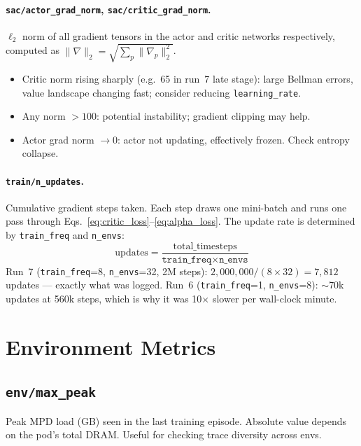 \documentclass[11pt]{article}
\begin{document}
\paragraph{\texttt{sac/actor\_grad\_norm}, \texttt{sac/critic\_grad\_norm}.}
$\ell_2$ norm of all gradient tensors in the actor and critic networks
respectively, computed as $\|\nabla\|_2 = \sqrt{\sum_p \|\nabla_p\|_2^2}$.
\begin{itemize}
  \item Critic norm rising sharply (e.g.\ 65 in run~7 late stage): large Bellman
        errors, value landscape changing fast; consider reducing \texttt{learning\_rate}.
  \item Any norm $> 100$: potential instability; gradient clipping may help.
  \item Actor grad norm $\to 0$: actor not updating, effectively frozen.
        Check entropy collapse.
\end{itemize}

\paragraph{\texttt{train/n\_updates}.}
Cumulative gradient steps taken.  Each step draws one mini-batch and runs one
pass through Eqs.~\ref{eq:critic_loss}--\ref{eq:alpha_loss}.
The update rate is determined by \texttt{train\_freq} and \texttt{n\_envs}:
\begin{equation}
  \text{updates}
  = \frac{\text{total\_timesteps}}{\texttt{train\_freq} \times \texttt{n\_envs}}
\end{equation}
Run~7 (\texttt{train\_freq}=8, \texttt{n\_envs}=32, 2M steps):
$2{,}000{,}000 / (8 \times 32) = 7{,}812$ updates --- exactly what was logged.
Run~6 (\texttt{train\_freq}=1, \texttt{n\_envs}=8): $\sim$70k updates at 560k
steps, which is why it was 10$\times$ slower per wall-clock minute.

\section{Environment Metrics}

\subsection*{\texttt{env/max\_peak}}
Peak MPD load (GB) seen in the last training episode.  Absolute value depends
on the pod's total DRAM.  Useful for checking trace diversity across envs.
\end{document}
